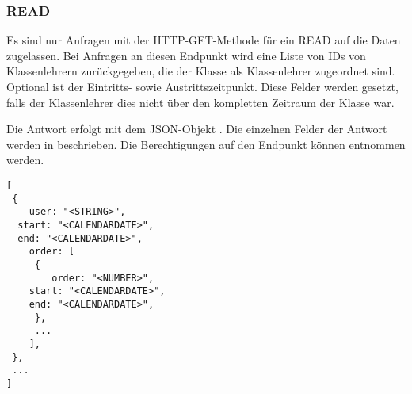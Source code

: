 \subsubsection{READ}
\label{sec:rest:api:classes:id:teachers:read}
Es sind nur Anfragen mit der HTTP-GET-Methode für ein READ auf die Daten zugelassen.
Bei Anfragen an diesen Endpunkt wird eine Liste von IDs von Klassenlehrern zurückgegeben, die der Klasse als Klassenlehrer zugeordnet sind.
Optional ist der Eintritts- sowie Austrittszeitpunkt. Diese Felder werden gesetzt, falls der Klassenlehrer dies nicht über den kompletten Zeitraum der Klasse war.

Die Antwort erfolgt mit dem JSON-Objekt . 
Die einzelnen Felder der Antwort werden in  beschrieben.
Die Berechtigungen auf den Endpunkt können  entnommen werden.

\begin{lstlisting}[caption={JSON-Antwort für einen GET-Aufruf der Route /api/classes/\$id/teachers},label={lst:code:rest:api:classes:id:teachers:read:ret},frame=tlrb]
[ 
 { 
	user: "<STRING>",
  start: "<CALENDARDATE>",
  end: "<CALENDARDATE>",
	order: [
	 {
		order: "<NUMBER>",
    start: "<CALENDARDATE>",
    end: "<CALENDARDATE>",
	 },
	 ...
	],
 },
 ... 
]
\end{lstlisting}

